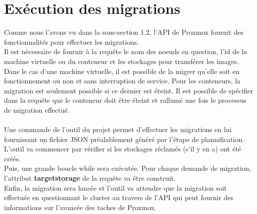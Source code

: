 \documentclass[14pt]{extarticle}
\begin{document}
\section{Exécution des migrations}
    Comme nous l'avons vu dans la sous-section 1.2, l'API de Proxmox fournit des fonctionnalités pour effectuer les migrations.\\
    Il est nécessaire de fournir à la requête le nom des noeuds en question, l'id de la machine virtuelle ou du conteneur et les stockages pour transférer les images. Dans le cas d'une machine virtuelle, il est possible de la migrer qu'elle soit en fonctionnement ou non et sans interruption de service. Pour les conteneurs, la migration est seulement possible si ce dernier est éteint. Il est possible de spécifier dans la requête que le conteneur doit être éteint et rallumé une fois le processus de migration effectué.\\
    \\
    Une commande de l'outil du projet permet d'effectuer les migrations en lui fournissant un fichier JSON préalablement généré par l'étape de plannification.\\
    L'outil va commencer par vérifier si les stockages réclamés (s'il y en a) ont été créés.\\
    Puis, une grande boucle while sera exécutée. Pour chaque demande de migration, l'attribut \textbf{targetstorage} de la requête va être construit.\\
    Enfin, la migration sera lancée et l'outil va attendre que la migration soit effectuée en questionnant le cluster au travers de l'API qui peut fournir des informations sur l'avancée des taches de Proxmox.
    \newpage
\end{document}
